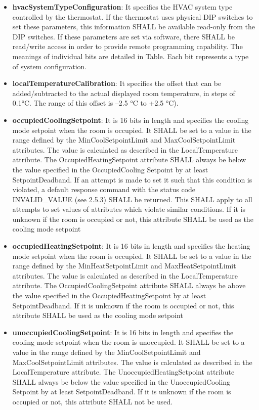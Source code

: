\begin{itemize}
\item \textbf{hvacSystemTypeConfiguration}:  It specifies the HVAC system type controlled by the thermostat. If the thermostat uses physical DIP switches to set these parameters, this information SHALL be available read-only from the DIP switches. If these parameters are set via software, there SHALL be read/write access in order to provide remote programming capability. The meanings of individual bits are detailed in Table. Each bit represents a type of system configuration.
\item \textbf{localTemperatureCalibration}: It specifies the offset that can be added/subtracted to the actual displayed room temperature, in steps of 0.1°C. The range of this offset is –2.5 °C to +2.5 °C).
\item \textbf{occupiedCoolingSetpoint}: It is 16 bits in length and specifies the cooling mode setpoint when the room is occupied. It SHALL be set to a value in the range defined by the MinCoolSetpointLimit and MaxCoolSetpointLimit attributes. The value is calculated as described in the LocalTemperature attribute. The OccupiedHeatingSetpoint attribute SHALL always be below the value specified in the OccupiedCooling Setpoint by at least SetpointDeadband. If an attempt is made to set it such that this condition is violated, a default response command with the status code INVALID\_VALUE (see 2.5.3) SHALL be returned. This SHALL apply to all attempts to set values of attributes which violate similar conditions. If it is unknown if the room is occupied or not, this attribute SHALL be used as the cooling mode setpoint
\item \textbf{occupiedHeatingSetpoint}: It  is 16 bits in length and specifies the heating mode setpoint when the room is occupied. It SHALL be set to a value in the range defined by the MinHeatSetpointLimit and MaxHeatSetpointLimit attributes. The value is calculated as described in the LocalTemperature attribute. The OccupiedCoolingSetpoint attribute SHALL always be above the value specified in the OccupiedHeatingSetpoint by at least SetpointDeadband. If it is unknown if the room is occupied or not, this attribute SHALL be used as the cooling mode setpoint
\item \textbf{unoccupiedCoolingSetpoint}: It  is 16 bits in length and specifies the cooling mode setpoint when the room is unoccupied. It SHALL be set to a value in the range defined by the MinCoolSetpointLimit and MaxCoolSetpointLimit attributes. The value is calculated as described in the LocalTemperature attribute. The UnoccupiedHeatingSetpoint attribute SHALL always be below the value specified in the UnoccupiedCooling Setpoint by at least SetpointDeadband. If it is unknown if the room is occupied or not, this attribute SHALL not be used.

\end{itemize}
